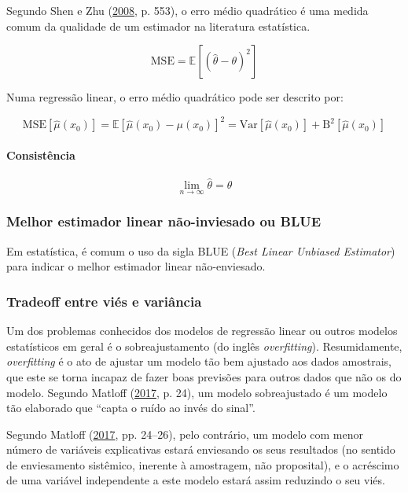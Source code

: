 \documentclass[a4paper, 12pt]{article}
\let\oldparagraph\paragraph
\renewcommand{\paragraph}[1]{\oldparagraph{#1}\mbox{}}
\begin{document}
Segundo Shen e Zhu (\protect\hyperlink{ref-shen}{2008}, p. 553), o erro
médio quadrático é uma medida comum da qualidade de um estimador na
literatura estatística.

\[\text{MSE} = \mathbb{E}[(\hat{\theta} - \theta)^2]\]

Numa regressão linear, o erro médio quadrático pode ser descrito por:

\[\text{MSE}[\hat{\mu}(x_0)] = \mathbb{E}[\hat{\mu}(x_0) - \mu(x_0)]^2 = \text{Var}[\hat{\mu}(x_0)] + \text{B}^2[\hat{\mu}(x_0)]\]

\paragraph{Consistência}\label{consistencia}

\[\lim_{n \rightarrow \infty}\hat{\theta} = \theta\]

\subsubsection{Melhor estimador linear não-inviesado ou
BLUE}\label{melhor-estimador-linear-nao-inviesado-ou-blue}

Em estatística, é comum o uso da sigla BLUE (\emph{Best Linear Unbiased
Estimator}) para indicar o melhor estimador linear não-enviesado.

\subsubsection{Tradeoff entre viés e
variância}\label{tradeoff-entre-vies-e-variancia}

Um dos problemas conhecidos dos modelos de regressão linear ou outros
modelos estatísticos em geral é o sobreajustamento (do inglês
\emph{overfitting}). Resumidamente, \emph{overfitting} é o ato de
ajustar um modelo tão bem ajustado aos dados amostrais, que este se
torna incapaz de fazer boas previsões para outros dados que não os do
modelo. Segundo Matloff (\protect\hyperlink{ref-matloff2017}{2017}, p.
24), um modelo sobreajustado é um modelo tão elaborado que ``capta o
ruído ao invés do sinal''.

Segundo Matloff (\protect\hyperlink{ref-matloff2017}{2017}, pp. 24--26),
pelo contrário, um modelo com menor número de variáveis explicativas
estará enviesando os seus resultados (no sentido de enviesamento
sistêmico, inerente à amostragem, não proposital), e o acréscimo de uma
variável independente a este modelo estará assim reduzindo o seu viés.
\end{document}
